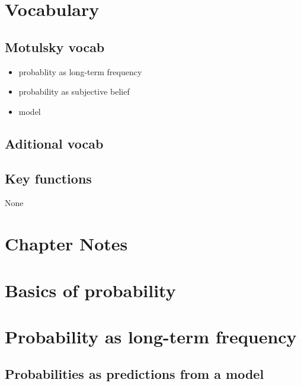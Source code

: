 \documentclass[]{book}
\providecommand{\tightlist}{%
  \setlength{\itemsep}{0pt}\setlength{\parskip}{0pt}}
\theoremstyle{definition}
\theoremstyle{definition}
\theoremstyle{definition}
\theoremstyle{remark}
\begin{document}
\section*{Vocabulary}\label{vocabulary-1}

\subsection*{Motulsky vocab}\label{motulsky-vocab-1}

\begin{itemize}
\tightlist
\item
  probablity as long-term frequency
\item
  probability as subjective belief
\item
  model
\end{itemize}

\subsection*{Aditional vocab}\label{aditional-vocab}

\subsection*{Key functions}\label{key-functions-1}

None

\section*{Chapter Notes}\label{chapter-notes-1}

\section{Basics of probability}\label{basics-of-probability}

\section{Probability as long-term
frequency}\label{probability-as-long-term-frequency}

\subsection{Probabilities as predictions from a
model}\label{probabilities-as-predictions-from-a-model}
\end{document}

